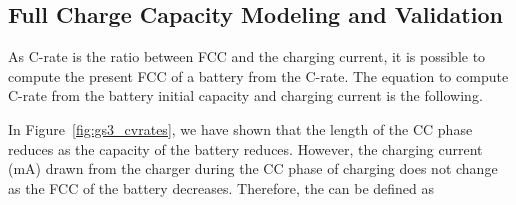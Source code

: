 \documentclass[journal]{IEEEtran}
\begin{document}
\subsection{Full Charge Capacity Modeling and Validation}
As C-rate is the ratio between FCC and the charging current, it is possible to compute the present FCC of a battery from the C-rate. The  equation to compute C-rate from the battery initial capacity and charging current is the following. 



In Figure~\ref{fig:gs3_cvrates}, we have shown that the length of the CC phase reduces as the capacity of the battery reduces. However, the charging current (mA) drawn from the charger during the CC phase of charging does not change as the FCC of the battery decreases. Therefore, the  can be defined as  
\end{document}
